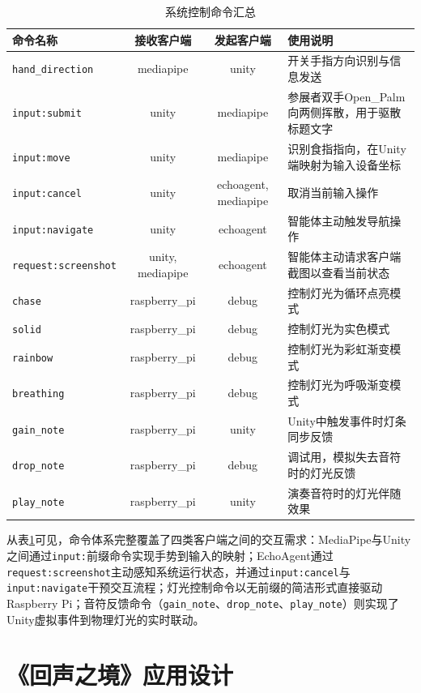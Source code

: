 \documentclass[bachelor]{njupthesis}
\begin{document}
\begin{table}[h]
\centering
\caption{系统控制命令汇总}
\begin{tabularx}{\linewidth}{lccX}
\toprule
命令名称 & 接收客户端 & 发起客户端 & 使用说明 \\
\midrule
\texttt{hand\_direction} & mediapipe & unity & 开关手指方向识别与信息发送 \\
\texttt{input:submit} & unity & mediapipe & 参展者双手Open\_Palm向两侧挥散，用于驱散标题文字 \\
\texttt{input:move} & unity & mediapipe & 识别食指指向，在Unity端映射为输入设备坐标 \\
\texttt{input:cancel} & unity & echoagent, mediapipe & 取消当前输入操作 \\
\texttt{input:navigate} & unity & echoagent & 智能体主动触发导航操作 \\
\texttt{request:screenshot} & unity, mediapipe & echoagent & 智能体主动请求客户端截图以查看当前状态 \\
\texttt{chase} & raspberry\_pi & debug & 控制灯光为循环点亮模式 \\
\texttt{solid} & raspberry\_pi & debug & 控制灯光为实色模式 \\
\texttt{rainbow} & raspberry\_pi & debug & 控制灯光为彩虹渐变模式 \\
\texttt{breathing} & raspberry\_pi & debug & 控制灯光为呼吸渐变模式 \\
\texttt{gain\_note} & raspberry\_pi & unity & Unity中触发事件时灯条同步反馈 \\
\texttt{drop\_note} & raspberry\_pi & debug & 调试用，模拟失去音符时的灯光反馈 \\
\texttt{play\_note} & raspberry\_pi & unity & 演奏音符时的灯光伴随效果 \\
\bottomrule
\end{tabularx}
\label{tbl:command-table}
\end{table}

从表\ref{tbl:command-table}可见，命令体系完整覆盖了四类客户端之间的交互需求：MediaPipe与Unity之间通过\texttt{input:}前缀命令实现手势到输入的映射；EchoAgent通过\texttt{request:screenshot}主动感知系统运行状态，并通过\texttt{input:cancel}与\texttt{input:navigate}干预交互流程；灯光控制命令以无前缀的简洁形式直接驱动Raspberry Pi；音符反馈命令（\texttt{gain\_note}、\texttt{drop\_note}、\texttt{play\_note}）则实现了Unity虚拟事件到物理灯光的实时联动。


\section{《回声之境》应用设计}
\label{sec:application-design}
\end{document}

